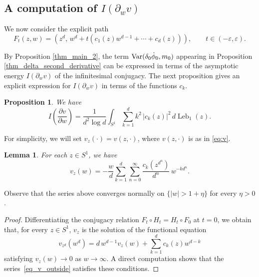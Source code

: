 \documentclass[11pt]{amsart}
\theoremstyle{plain}
\newtheorem{prop}[thm]{Proposition}
\newtheorem{lem}[thm]{Lemma}
\theoremstyle{definition}
\theoremstyle{remark}
\DeclareMathOperator{\Leb}{Leb}
\begin{document}
\subsection{A computation of $I(\partial_w v)$}
\label{sec_CM5}

We
now consider the explicit path
\[
F_t(z,w)=(z^d,\,w^d+t(c_1(z)w^{d-1}+\cdots+c_d(z))),
\qquad t\in(-\varepsilon,\varepsilon).
\]

By Proposition
\ref{thm_main_2},
 the term
${\rm Var}(\delta_0\dot\phi_0,m_0)$ 
appearing in 
Proposition \ref{thm_delta_second_derivative}
can be expressed in terms of the asymptotic energy
$I(\partial_w v)$ of the infinitesimal conjugacy.
The next proposition gives an explicit expression 
for $I(\partial_w v)$
 in terms of
the functions $c_k$.

\begin{prop}\label{prop_extra_term}
We have
\[
I
\left(
\frac{\partial v}{\partial w}\right)
=
\frac{1}{d^2\log d
}
\int_{S^1}
\sum_{k=1}^d k^2\,|c_k(z)|^2\,
d\Leb_1 (z).
\]
\end{prop}

 For simplicity,
we will set $v_z(\cdot) = v(z,\cdot)$, where
$v(z,\cdot)$ is as in \eqref{eq:v}.



\begin{lem}\label{lem_expansion_v}
For each $z\in S^1$,
 we have
\begin{equation}\label{eq_v_outside}
v_z(w)
=
-\frac{w}{d}
\sum_{k=1}^d\sum_{n=0}^{\infty}
\frac{c_k(z^{d^n})}{d^n}\,w^{-k d^n}.
\end{equation}
\end{lem}

Observe that the series above 
converges normally on $\{|w|>1+\eta\}$ for every $\eta>0$.


\begin{proof}
Differentiating the conjugacy relation
$F_t\circ H_t=H_t\circ F_0$ at $t=0$,
we obtain that,
for every $z\in S^1$,
 $v_z$ 
is the solution of the functional equation
\[
v_{z^d}(w^d)
=
d\,w^{d-1}v_z(w)
+
\sum_{k=1}^d c_k(z)w^{d-k}
\]
satisfying
$v_z(w)\to0$ as $w\to\infty$.
A direct computation shows that  
the series~\eqref{eq_v_outside}
satisfies these conditions.
\end{proof}
\end{document}
